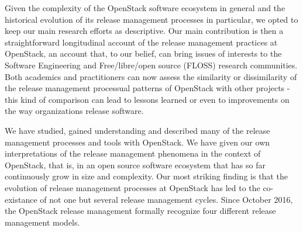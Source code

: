 \documentclass[dvipsnames]{interact}
\theoremstyle{plain}\newtheorem{theorem}{Theorem}[section]
\theoremstyle{definition}
\theoremstyle{remark}
\begin{document}
Given the complexity of the OpenStack software ecosystem in general and the historical evolution of its release management processes in particular, we opted to keep our main research efforts as descriptive. Our main contribution is then a straightforward longitudinal account of the release management practices at OpenStack, an account that, to our belief,  can bring issues of interests to the Software Engineering and Free/libre/open source (FLOSS) research communities. Both academics and practitioners can now assess the similarity or dissimilarity of the release management processual patterns of OpenStack with other projects - this kind of comparison can lead to lessons learned or even to improvements on the way organizations release software.  

We have studied, gained understanding and described many of the release management processes and tools with OpenStack. We have given our own interpretations of the release management phenomena in the context of OpenStack, that is, in an open source software ecosystem that has so far continuously grow in size and complexity. Our most striking finding is that the evolution of release management processes at OpenStack  has led to the co-existance of not one but several release management cycles. Since October 2016, the OpenStack release management formally recognize four different release management models. 
\end{document}
